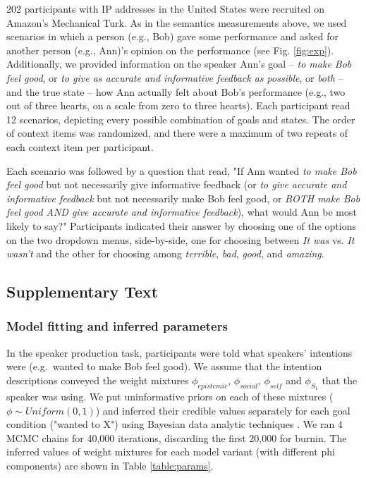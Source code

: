 \documentclass[12pt]{article}
\begin{document}
202 participants with IP addresses in the United States were recruited on Amazon's Mechanical Turk.
As in the semantics measurements above, we used scenarios in which a person (e.g., Bob) gave some performance and asked for another person (e.g., Ann)'s opinion on the performance (see Fig. \ref{fig:exp}). 
Additionally, we provided information on the speaker Ann's goal -- \emph{to make Bob feel good}, or \emph{to give as accurate and informative feedback as possible}, or \emph{both} -- 
and the true state -- how Ann actually felt about Bob's performance (e.g., two out of three hearts, on a scale from zero to three hearts). 
Each participant read 12 scenarios, depicting every possible combination of goals and states. 
The order of context items was randomized, and there were a maximum of two repeats of each context item per participant.

Each scenario was followed by a question that read, "If Ann wanted \emph{to make Bob feel good} but not necessarily give informative feedback (or \emph{to give accurate and informative feedback} but not necessarily make Bob feel good, or \emph{BOTH make Bob feel good AND give accurate and informative feedback}), what would Ann be most likely to say?" Participants indicated their answer by choosing one of the options on the two dropdown menus, side-by-side, one for choosing between \emph{It was} vs. \emph{It wasn't} and the other for choosing among \emph{terrible}, \emph{bad}, \emph{good}, and \emph{amazing}.

\subsection*{Supplementary Text}

\subsubsection*{Model fitting and inferred parameters}

In the speaker production task, participants were told what speakers' intentions were 
(e.g.~wanted to make Bob feel good). 
We assume that the intention descriptions conveyed the weight mixtures $\phi_{epistemic}$, $\phi_{social}$, $\phi_{self}$ and $\phi_{S_1}$ that the speaker was using. 
We put uninformative priors on each of these mixtures ($\phi \sim Uniform(0,1)$) 
and inferred their credible values separately for each goal condition ("wanted to X") 
using Bayesian data analytic techniques \cite{lee2014}. 
We ran 4 MCMC chains for 40,000 iterations, discarding the first 20,000 for burnin. 
The inferred values of weight mixtures for each model variant (with different phi components) are shown in Table \ref{table:params}.
\end{document}
